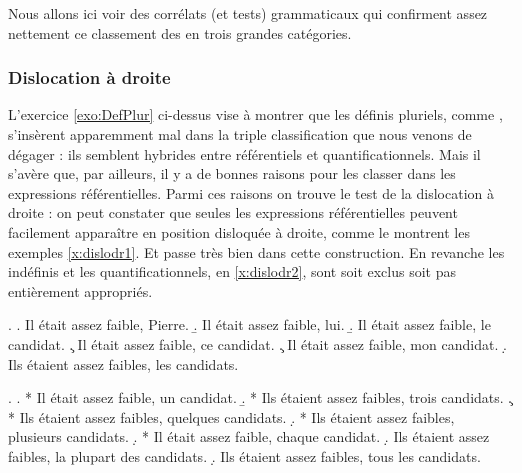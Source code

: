 Nous allons ici voir des corrélats (et tests) grammaticaux qui confirment assez nettement ce classement des {\GN} en trois grandes catégories. %


\subsubsection{Dislocation à droite}


L'exercice \ref{exo:DefPlur} ci-dessus vise à montrer que les définis pluriels, comme , s'insèrent apparemment mal dans la triple classification que nous venons de dégager : ils semblent hybrides entre référentiels et quantificationnels.  Mais il s'avère que, par ailleurs, il y a de bonnes raisons pour les classer dans les expressions référentielles.  
Parmi ces raisons on trouve le test de la dislocation à droite : on peut constater que seules les expressions référentielles peuvent facilement apparaître en position disloquée à droite, comme le montrent les exemples \ref{x:dislodr1}.
Et  passe très bien dans cette construction. 
En revanche les indéfinis et les quantificationnels, en  \ref{x:dislodr2}, sont soit exclus soit pas entièrement appropriés. 


\ex.  \label{x:dislodr1}
\a. Il était assez faible, Pierre.
\b. Il était assez faible, lui.
\b. Il était assez faible, le candidat.
\c. Il était assez faible, ce candidat.
\c. Il était assez faible, mon candidat.
\d. Ils étaient assez faibles, les candidats.

\ex.  \label{x:dislodr2}
\a. * Il était assez faible, un candidat.
\b. * Ils étaient assez faibles, trois candidats.
\c. * Ils étaient assez faibles, quelques candidats.
\d. * Ils étaient assez faibles, plusieurs candidats.
\d. * Il était assez faible, chaque candidat.
\d. \juge{\urgh} Ils étaient assez faibles, la plupart des candidats.
\d. \juge{\urgh} Ils étaient assez faibles, tous les candidats.


